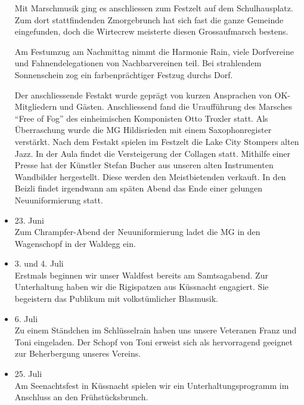 \begin{history}
\begin{itemize}
              Mit Marschmusik ging es anschliessen zum Festzelt auf dem
              Schulhausplatz. Zum dort stattfindenden Zmorgebrunch hat sich fast die
              ganze Gemeinde eingefunden, doch die Wirtecrew meisterte diesen
              Grossaufmarsch bestens.

              Am Festumzug am Nachmittag nimmt die Harmonie Rain, viele Dorfvereine
              und Fahnendelegationen von Nachbarvereinen teil. Bei strahlendem
              Sonnenschein zog ein farbenprächtiger Festzug durchs Dorf.

              Der anschliessende Festakt wurde geprägt von kurzen Ansprachen
              von OK-Mitgliedern und Gästen. Anschliessend fand die Uraufführung des
              Marsches \enquote{Free of Fog} des einheimischen Komponisten Otto
              Troxler statt. Als Überraschung wurde die MG Hildisrieden mit einem
              Saxophonregister verstärkt. Nach dem Festakt spielen im Festzelt die
              Lake City Stompers alten Jazz. In der Aula findet die Versteigerung der
              Collagen statt. Mithilfe einer Presse hat der Künstler Stefan Bucher aus
              unseren alten Instrumenten Wandbilder hergestellt. Diese werden den
              Meistbietenden verkauft. In den Beizli findet irgendwann am späten Abend
              das Ende einer gelungen Neuuniformierung statt.

        \item 23. Juni\\
              Zum Chrampfer-Abend der Neuuniformierung ladet die MG in den Wagenschopf
              in der Waldegg ein.

        \item 3. und 4. Juli\\
              Erstmals beginnen wir unser Waldfest bereits am Samtsagabend. Zur
              Unterhaltung haben wir die Rigispatzen aus Küssnacht engagiert. Sie
              begeistern das Publikum mit volkstümlicher Blasmusik.

        \item 6. Juli\\
              Zu einem Ständchen im Schlüsselrain haben uns unsere Veteranen Franz und
              Toni eingeladen. Der Schopf von Toni erweist sich als hervorragend
              geeignet zur Beherbergung unseres Vereins.

        \item 25. Juli\\
              Am Seenachtsfest in Küssnacht spielen wir ein Unterhaltungsprogramm im
              Anschluss an den Frühstücksbrunch.


\end{itemize}
\end{history}

